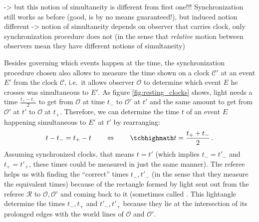 -> but this notion of simultaneity is different from first one!!! Synchronization still works as before (good, is by no means guaranteed!), but induced notion different -> notion of simultaneity depends on observer that carries clock, only synchronization procedure does not (in the sense that \emph{relative} motion between observers mean they have different notions of simultaneity)


Besides governing which events happen at the time, the synchronization procedure chosen also allows to measure the time shown on a clock $\mathcal{C}'$ at an event $E'$ from the clock $\mathcal{C}$, i.e.~it allows observer $\mathcal{O}$ to determine which event $E$ he crosses was simultaneous to $E'$. As figure \ref{fig:resting_clocks} shows, light needs a time $\frac{t_+ - t_-}{2}$ to get from $\mathcal{O}$ at time $t_-$ to $\mathcal{O}'$ at $t'$ and the same amount to get from $\mathcal{O}'$ at $t'$ to $\mathcal{O}$ at $t_+$. Therefore, we can determine the time $t$ of an event $E$ happening simultaneous to $E'$ at $t'$ by rearranging:
\begin{equation}\label{eq:time_synchr}
t - t_- = t_+ - t
\qquad \Leftrightarrow \qquad
\eqbox{
t = \frac{t_+ + t_-}{2}
} \, .
\end{equation}
Assuming synchronized clocks, that means $t = t'$ (which implies $t_- = t'_-$ and $t_+ = t'_+$, these times could be measured in just the same manner). The referee helps us with finding the \enquote{correct} times $t_-, t'_-$ (in the sense that they measure the equivalent times) because of the rectangle formed by light sent out from the referee $\mathcal{R}$ to $\mathcal{O}, \mathcal{O}'$ and coming back to it (sometimes called . This lightangle determine the times $t_-, t_+$ and $t'_-, t'_+$ because they lie at the intersection of its prolonged edges with the world lines of $\mathcal{O}$ and $\mathcal{O}'$.

